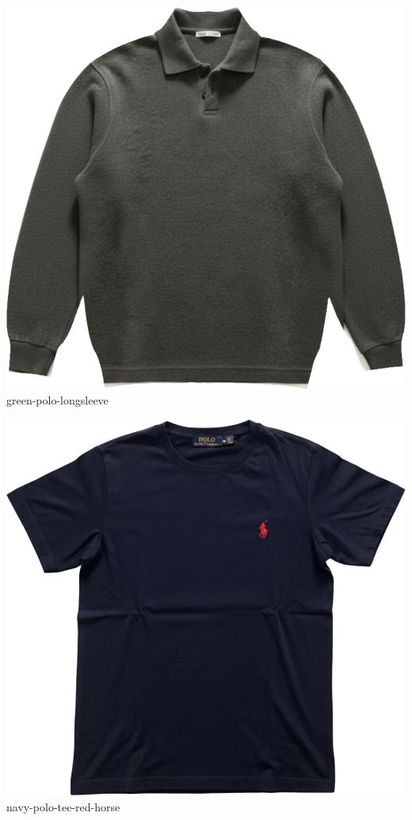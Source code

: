 \documentclass[10pt]{article}
\begin{document}
\
\vspace{2mm}\
\begin{minipage}[t]{0.22\textwidth}\centering\vspace{0mm}
\includegraphics[width=\linewidth,keepaspectratio]{assets/midlayer/green-polo-longsleeve.png}\\
\vspace{0.5mm}\tiny green-polo-longsleeve\end{minipage}
\begin{minipage}[t]{0.22\textwidth}\centering\vspace{0mm}
\includegraphics[width=\linewidth,keepaspectratio]{assets/tees/navy-polo-tee-red-horse.png}\\
\vspace{0.5mm}\tiny navy-polo-tee-red-horse\end{minipage}
\end{document}
